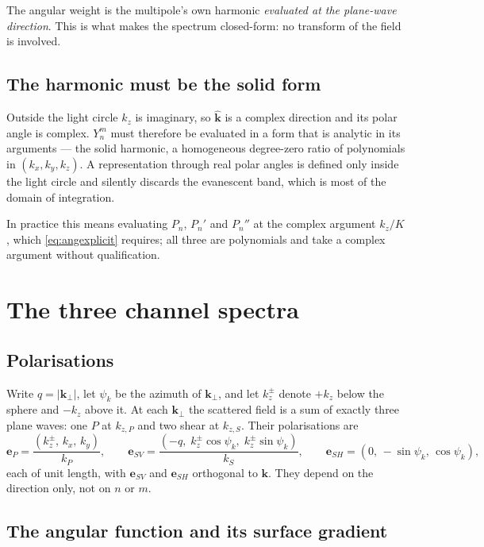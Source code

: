 \documentclass[11pt,a4paper]{article}
\newcommand{\bk}{\mathbf{k}}
\newcommand{\bep}{\mathbf{e}}
\newcommand{\khat}{\hat{\bk}}
\newcommand{\kperp}{\bk_\perp}
\begin{document}
The angular weight is the multipole's own harmonic \emph{evaluated at the
plane-wave direction}.  This is what makes the spectrum closed-form: no
transform of the field is involved.

\subsection{The harmonic must be the solid form}\label{sec:solid}

Outside the light circle $k_z$ is imaginary, so $\khat$ is a complex direction
and its polar angle is complex.  $Y_n^m$ must therefore be evaluated in a form
that is analytic in its arguments --- the solid harmonic, a homogeneous
degree-zero ratio of polynomials in $(k_x,k_y,k_z)$.  A representation through
real polar angles is defined only inside the light circle and silently discards
the evanescent band, which is most of the domain of integration.

In practice this means evaluating $P_n$, $P_n'$ and $P_n''$ at the complex
argument $k_z/K$, which \eqref{eq:angexplicit} requires; all three are
polynomials and take a complex argument without qualification.

\section{The three channel spectra}\label{sec:spectra}

\subsection{Polarisations}

Write $q = |\kperp|$, let $\psi_k$ be the azimuth of $\kperp$, and let
$k_z^{\pm}$ denote $+k_z$ below the sphere and $-k_z$ above it.  At each
$\kperp$ the scattered field is a sum of exactly three plane waves: one $P$ at
$k_{z,P}$ and two shear at $k_{z,S}$.  Their polarisations are
\begin{equation}\label{eq:pols}
  \bep_P = \frac{(k_z^{\pm},\,k_x,\,k_y)}{k_P},
  \qquad
  \bep_{SV} = \frac{(-q,\;k_z^{\pm}\cos\psi_k,\;k_z^{\pm}\sin\psi_k)}{k_S},
  \qquad
  \bep_{SH} = (0,\,-\sin\psi_k,\,\cos\psi_k),
\end{equation}
each of unit length, with $\bep_{SV}$ and $\bep_{SH}$ orthogonal to $\bk$.
They depend on the direction only, not on $n$ or $m$.

\subsection{The angular function and its surface gradient}
\end{document}
